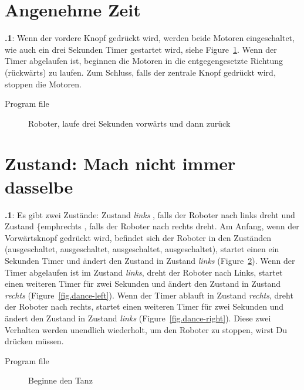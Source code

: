 \documentclass[12pt,a4paper,ngerman]{article}
\begin{document}
\section{Angenehme Zeit}

\textbf{\thesection.1}:
Wenn der vordere Knopf gedrückt wird, werden beide Motoren eingeschaltet, wie auch ein drei Sekunden Timer gestartet wird, siehe Figure~\ref{fig.three}. Wenn der Timer abgelaufen ist, beginnen die Motoren in die entgegengesetzte Richtung (rückwärts) zu laufen. Zum Schluss, falls der zentrale Knopf gedrückt wird, stoppen die Motoren.

{\raggedleft \hfill Program file }


\begin{figure}[hbt]
\begin{center}
\caption{Roboter, laufe drei Sekunden vorwärts und dann zurück}
\label{fig.three}
\end{center}
\end{figure}


\section{Zustand: Mach nicht immer dasselbe}


\textbf{\thesection.1}:
Es gibt zwei Zustände: Zustand \emph{links} , falls der Roboter nach links dreht und Zustand \{emph{rechts}  , falls der Roboter nach rechts dreht. Am Anfang, wenn der Vorwärtsknopf gedrückt wird, befindet sich der Roboter in den Zuständen (ausgeschaltet, ausgeschaltet, ausgeschaltet, ausgeschaltet), startet einen ein Sekunden Timer und ändert den Zustand in Zustand \emph{links} (Figure~\ref{fig.dance-start}). Wenn der Timer abgelaufen ist im Zustand \emph{links}, dreht der Roboter nach Links, startet einen weiteren Timer für zwei Sekunden und ändert den Zustand in Zustand \emph{rechts} (Figure~\ref{fig.dance-left}). Wenn der Timer ablauft in Zustand \emph{rechts}, dreht der Roboter nach rechts, startet einen weiteren Timer für zwei Sekunden und ändert den Zustand in Zustand \emph{links} (Figure~\ref{fig.dance-right}). Diese zwei Verhalten werden unendlich wiederholt, um den Roboter zu stoppen, wirst Du drücken müssen.

{\raggedleft \hfill Program file }


\begin{figure}
\begin{center}
\caption{Beginne den Tanz}
\label{fig.dance-start}
\end{center}
\end{figure}
\end{document}
